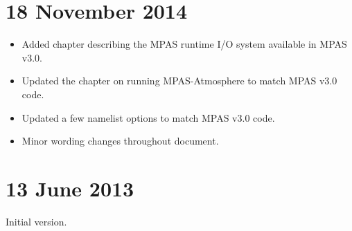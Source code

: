 \section*{18 November 2014}

\begin{itemize}
\item Added chapter describing the MPAS runtime I/O system available in MPAS v3.0.
\item Updated the chapter on running MPAS-Atmosphere to match MPAS v3.0 code.
\item Updated a few namelist options to match MPAS v3.0 code.
\item Minor wording changes throughout document.
\end{itemize}

\section*{13 June 2013}

Initial version.
